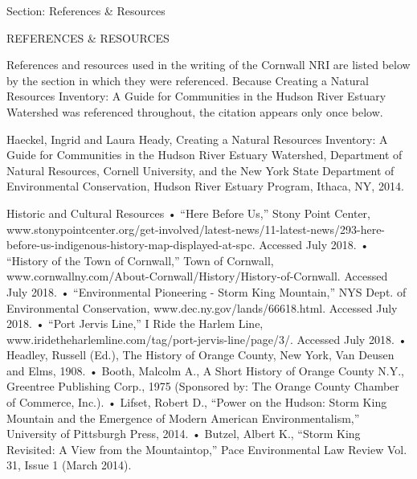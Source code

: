 Section: References & Resources

REFERENCES & RESOURCES

References and resources used in the writing of the Cornwall NRI are listed below by the section in which they were referenced. Because Creating a Natural Resources Inventory: A Guide for Communities in the Hudson River Estuary Watershed was referenced throughout, the citation appears only once below.

Haeckel, Ingrid and Laura Heady, Creating a Natural Resources Inventory: A Guide for Communities in the Hudson River Estuary Watershed, Department of Natural Resources, Cornell University, and the New York State Department of Environmental Conservation, Hudson River Estuary Program, Ithaca, NY, 2014.

Historic and Cultural Resources
    • “Here Before Us,” Stony Point Center, www.stonypointcenter.org/get-involved/latest-news/11-latest-news/293-here-before-us-indigenous-history-map-displayed-at-spc. Accessed July 2018. 
    • “History of the Town of Cornwall,” Town of Cornwall, www.cornwallny.com/About-Cornwall/History/History-of-Cornwall. Accessed July 2018.
    • “Environmental Pioneering - Storm King Mountain,” NYS Dept. of Environmental Conservation, www.dec.ny.gov/lands/66618.html. Accessed July 2018. 
    • “Port Jervis Line,” I Ride the Harlem Line, www.iridetheharlemline.com/tag/port-jervis-line/page/3/. Accessed July 2018. 
    • Headley, Russell (Ed.), The History of Orange County, New York, Van Deusen and Elms, 1908.
    • Booth, Malcolm A., A Short History of Orange County N.Y., Greentree Publishing Corp., 1975 (Sponsored by: The Orange County Chamber of Commerce, Inc.).
    • Lifset, Robert D., “Power on the Hudson: Storm King Mountain and the Emergence of Modern American Environmentalism,” University of Pittsburgh Press, 2014.
    • Butzel, Albert K., “Storm King Revisited: A View from the Mountaintop,” Pace Environmental Law Review Vol. 31, Issue 1 (March 2014).

